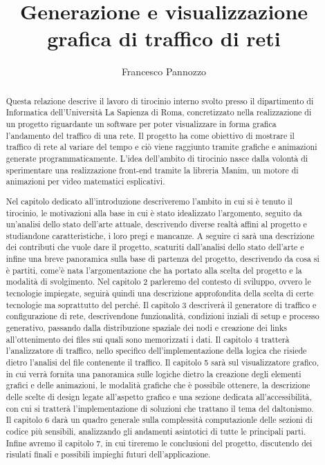 \documentclass[binding=0.6cm]{sapthesis}
\title{Generazione e visualizzazione grafica di traffico di reti}
\author{Francesco Pannozzo}
\begin{document}
\frontmatter
\maketitle
\dedication{Dedicato alla\\ mia famiglia}
\begin{abstract}
Questa relazione descrive il lavoro di tirocinio interno svolto presso il dipartimento di Informatica dell'Università La Sapienza di Roma, 
concretizzato nella realizzazione 
di un progetto riguardante un software per poter visualizzare in forma grafica l'andamento 
del traffico di una rete.
Il progetto ha come obiettivo di mostrare il traffico di rete al variare del tempo e ciò viene raggiunto
tramite grafiche e animazioni generate programmaticamente. L'idea dell'ambito di tirocinio nasce 
dalla volontà di sperimentare una realizzazione front-end tramite la libreria Manim, un motore di animazioni per video
matematici esplicativi. 

Nel capitolo dedicato all'introduzione descriveremo l'ambito in cui si è tenuto il tirocinio, le motivazioni
alla base in cui è stato idealizzato l'argomento, seguito da un'analisi dello stato dell'arte attuale, descrivendo diverse realtà affini al progetto
e studiandone caratteristiche, i loro pregi e mancanze. A seguire ci sarà una descrizione dei contributi che vuole dare il progetto, scaturiti dall'analisi
dello stato dell'arte e infine una breve panoramica sulla base di partenza del progetto, descrivendo da cosa si è partiti, come'è nata l'argomentazione
che ha portato alla scelta del progetto e la modalità di svolgimento. Nel capitolo 2 parleremo del contesto di sviluppo, ovvero le tecnologie impiegate,
seguirà quindi una descrizione approfondita della scelta di certe tecnologie ma soprattutto del perché. Il capitolo 3
descriverà il generatore di traffico e configurazione di rete, descrivendone funzionalità, condizioni inziali di setup e 
processo generativo, passando dalla distribuzione spaziale dei nodi e creazione dei links all'ottenimento dei files sui quali sono
 memorizzati i dati.
Il capitolo 4 tratterà l'analizzatore di traffico, nello specifico dell'implementazione della logica che risiede dietro l'analisi del file contenente il
 traffico.
Il capitolo 5 sarà sul visualizzatore grafico, in cui verrà fornita una panoramica sulle logiche dietro la creazione degli elementi grafici e delle 
animazioni, le modalità
grafiche che è possibile ottenere, la descrizione delle scelte di design legate all'aspetto grafico e una sezione dedicata all'accessibilità, con cui 
si tratterà
l'implementazione di soluzioni che trattano il tema del daltonismo. Il capitolo 6 darà un quadro generale sulla complessità computazionle delle sezioni 
di codice più sensibili, analizzando gli andamenti asintotici di tutte le principali parti.
Infine avremo il capitolo 7, in cui tireremo le conclusioni del progetto, discutendo dei risulati finali e possibili impieghi futuri dell'applicazione.

\end{abstract}
\tableofcontents
\mainmatter
\end{document}
